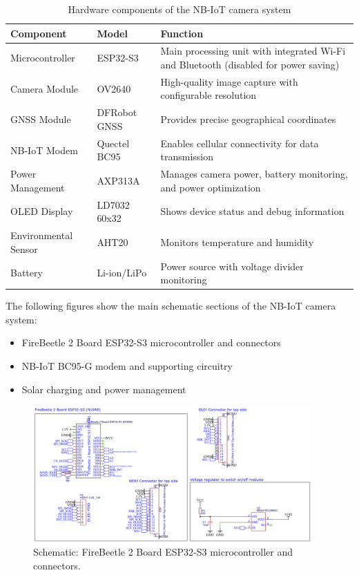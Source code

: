 \documentclass[11pt,a4paper]{article}
\begin{document}
\begin{table}[h]
\centering
\begin{tabular}{@{}llp{8cm}@{}}
\toprule
\textbf{Component} & \textbf{Model} & \textbf{Function} \\
\midrule
Microcontroller & ESP32-S3 & Main processing unit with integrated Wi-Fi and Bluetooth (disabled for power saving) \\
Camera Module & OV2640 & High-quality image capture with configurable resolution \\
GNSS Module & DFRobot GNSS & Provides precise geographical coordinates \\
NB-IoT Modem & Quectel BC95 & Enables cellular connectivity for data transmission \\
Power Management & AXP313A & Manages camera power, battery monitoring, and power optimization \\
OLED Display & LD7032 60x32 & Shows device status and debug information \\
Environmental Sensor & AHT20 & Monitors temperature and humidity \\
Battery & Li-ion/LiPo & Power source with voltage divider monitoring \\
\bottomrule
\end{tabular}
\caption{Hardware components of the NB-IoT camera system}
\label{tab:components}
\end{table}

The following figures show the main schematic sections of the NB-IoT camera system:

\begin{itemize}
    \item FireBeetle 2 Board ESP32-S3 microcontroller and connectors
    \item NB-IoT BC95-G modem and supporting circuitry
    \item Solar charging and power management
\end{itemize}

\begin{figure}[h]
    \centering
    \includegraphics[width=0.95\textwidth]{tex_photos/schematic_firebeetle.png}
    \caption{Schematic: FireBeetle 2 Board ESP32-S3 microcontroller and connectors.}
    \label{fig:schematic-firebeetle}
\end{figure}
\end{document}
